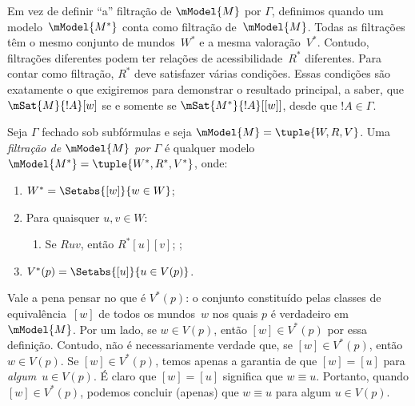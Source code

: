 \documentclass[../../../include/open-logic-section]{subfiles}
\begin{document}


Em vez de definir ``a'' filtração de $\mModel{M}$ por $\Gamma$,
definimos quando um modelo~$\mModel{M^*}$ conta como filtração
de~$\mModel{M}$. Todas as filtrações têm o mesmo conjunto de
mundos~$W^*$ e a mesma valoração~$V^*$. Contudo, filtrações diferentes
podem ter relações de acessibilidade~$R^*$ diferentes. Para contar
como filtração, $R^*$ deve satisfazer várias condições. Essas condições
são exatamente o que exigiremos para demonstrar o resultado principal,
a saber, que $\mSat{M}{!A}[w]$ se e somente se
$\mSat{M^*}{!A}[{[w]}]$, desde que $!A \in \Gamma$.

\begin{defn}
  Seja $\Gamma$ fechado sob subfórmulas e seja
  $\mModel{M} = \tuple{W, R, V}$. Uma \emph{filtração de $\mModel{M}$
  por $\Gamma$} é qualquer modelo
  $\mModel{M^*} = \tuple{W^*,R^*,V^*}$, onde:
  \begin{enumerate}
  \item $W^* = \Setabs{[w]}{w \in W}$;
  \item {}%
    Para quaisquer $u,v \in W$:
    \begin{enumerate}
    \item {}%
      Se $Ruv$, então $R^*[u][v]$;
    ;
    \end{enumerate}
  \item $V^*(p) = \Setabs{[u]}{u \in V(p)}$.
  \end{enumerate}
\end{defn}

Vale a pena pensar no que é $V^*(p)$: o conjunto constituído pelas
classes de equivalência~$[w]$ de todos os mundos~$w$ nos quais $p$ é
verdadeiro em~$\mModel{M}$. Por um lado, se $w \in V(p)$, então
$[w] \in V^*(p)$ por essa definição. Contudo, não é necessariamente
verdade que, se $[w] \in V^*(p)$, então $w \in V(p)$. Se
$[w] \in V^*(p)$, temos apenas a garantia de que $[w] = [u]$ para
\emph{algum}~$u \in V(p)$. É claro que $[w] = [u]$ significa que
$w \equiv u$. Portanto, quando $[w] \in V^*(p)$, podemos concluir
(apenas) que $w \equiv u$ para algum $u \in V(p)$.
\end{document}

